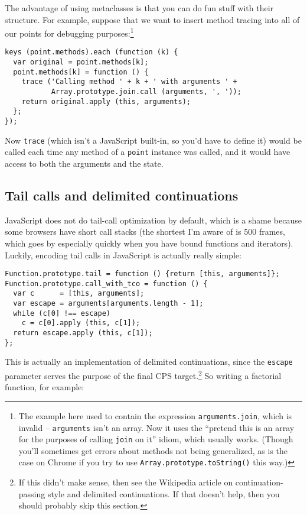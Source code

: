 \documentclass{article}
\begin{document}
    The advantage of using metaclasses is that you can do fun stuff with their structure. For example, suppose that we want to insert method tracing into all of our points for debugging
    purposes:\footnote{The example here used to contain the expression {\tt arguments.join}, which is invalid -- {\tt arguments} isn't an array. Now it uses the ``pretend this is an array for
    the purposes of calling {\tt join} on it'' idiom, which usually works. (Though you'll sometimes get errors about methods not being generalized, as is the case on Chrome if you try to use
    {\tt Array.prototype.toString()} this way.)}

\begin{verbatim}
keys (point.methods).each (function (k) {
  var original = point.methods[k];
  point.methods[k] = function () {
    trace ('Calling method ' + k + ' with arguments ' +
           Array.prototype.join.call (arguments, ', '));
    return original.apply (this, arguments);
  };
});
\end{verbatim}

    Now \verb|trace| (which isn't a JavaScript built-in, so you'd have to define it) would be called each time any method of a \verb|point| instance was called, and it would have access to
    both the arguments and the state.

\subsection {Tail calls and delimited continuations}
    JavaScript does not do tail-call optimization by default, which is a shame because some browsers have short call stacks (the shortest I'm aware of is 500 frames, which goes by especially
    quickly when you have bound functions and iterators). Luckily, encoding tail calls in JavaScript is actually really simple:

\begin{verbatim}
Function.prototype.tail = function () {return [this, arguments]};
Function.prototype.call_with_tco = function () {
  var c      = [this, arguments];
  var escape = arguments[arguments.length - 1];
  while (c[0] !== escape)
    c = c[0].apply (this, c[1]);
  return escape.apply (this, c[1]);
};
\end{verbatim}

    This is actually an implementation of delimited continuations, since the \verb|escape| parameter serves the purpose of the final CPS target.\footnote{If this didn't make sense, then see
    the Wikipedia article on continuation-passing style and delimited continuations. If that doesn't help, then you should probably skip this section.} So writing a factorial function, for
    example:
\end{document}
